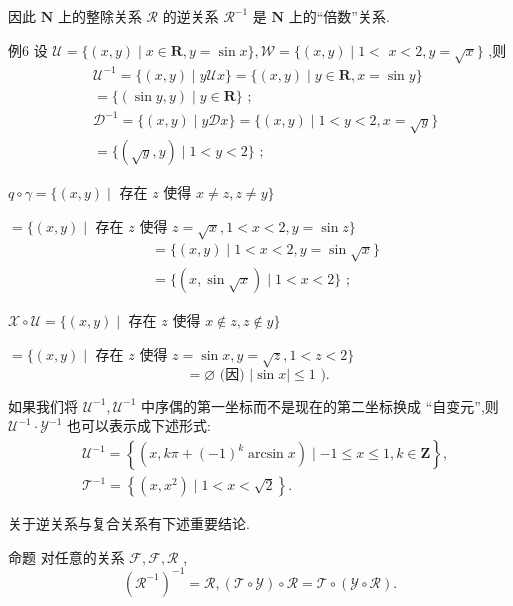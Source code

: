 因此 $\mathbf{N}$ 上的整除关系 $\mathcal{R}$ 的逆关系 ${\mathcal{R}}^{-1}$ 是 $\mathbf{N}$ 上的“倍数”关系.

例6 设 $\mathcal{U} = \{ \left( {x,y}\right)  \mid  x \in  \mathbf{R},y = \sin x\} ,\mathcal{W} = \{ \left( {x,y}\right)  \mid  1 <$  $x < 2,y = \sqrt{x}\}$ ,则
\begin{align*}
	&{\mathcal{U}}^{-1} = \{ \left( {x,y}\right)  \mid  y\mathcal{U}x\}  = \{ \left( {x,y}\right)  \mid  y \in  \mathbf{R},x = \sin y\}\\
	&= \{ \left( {\sin y,y}\right)  \mid  y \in  \mathbf{R}\} \text{ ; }\\
	&{\mathcal{D}}^{-1} = \{ \left( {x,y}\right)  \mid  y\mathcal{D}x\}  = \{ \left( {x,y}\right)  \mid  1 < y < 2,x = \sqrt{y}\}\\
	&= \{ \left( {\sqrt{y},y}\right)  \mid  1 < y < 2\} \text{ ; }
\end{align*}

$q \circ  \gamma  = \{ \left( {x,y}\right)  \mid$ 存在 $z$ 使得 $x \neq  z,z \neq  y\}$

$= \{ \left( {x,y}\right)  \mid$ 存在 $z$ 使得 $z = \sqrt{x},1 < x < 2,y = \sin z\}$
\begin{align*}
	&= \{ \left( {x,y}\right)  \mid  1 < x < 2,y = \sin \sqrt{x}\}\\
	&= \{ \left( {x,\sin \sqrt{x}}\right)  \mid  1 < x < 2\} \text{ ; }
\end{align*}

$\mathcal{X} \circ  \mathcal{U} = \{ \left( {x,y}\right)  \mid$ 存在 $z$ 使得 $x \notin  z,z \notin  y\}$

$= \{ \left( {x,y}\right)  \mid$ 存在 $z$ 使得 $z = \sin x,y = \sqrt{z},1 < z < 2\}$
$$= \varnothing \text{ (因) }\left| {\sin x}\right|  \leq  1\text{ ). }$$

如果我们将 ${\mathcal{U}}^{-1},{\mathcal{U}}^{-1}$ 中序偶的第一坐标而不是现在的第二坐标换成 “自变元”,则 ${\mathcal{U}}^{-1} \cdot  {\mathcal{Y}}^{-1}$ 也可以表示成下述形式:
\begin{align*}
	&{\mathcal{U}}^{-1} = \left\{  {\left( {x,{k\pi } + {\left( -1\right) }^{k}\arcsin x}\right)  \mid   - 1 \leq  x \leq  1,k \in  \mathbf{Z}}\right\}  ,\\
	&{\mathcal{T}}^{-1} = \left\{  {\left( {x,{x}^{2}}\right)  \mid  1 < x < \sqrt{2}}\right\}  .
\end{align*}

关于逆关系与复合关系有下述重要结论.

命题 对任意的关系 $\mathcal{F},\mathcal{F},\mathcal{R}$ ,
$${\left( {\mathcal{R}}^{-1}\right) }^{-1} = \mathcal{R},\left( {\mathcal{T} \circ  \mathcal{Y}}\right)  \circ  \mathcal{R} = \mathcal{T} \circ  \left( {\mathcal{Y} \circ  \mathcal{R}}\right) .$$

